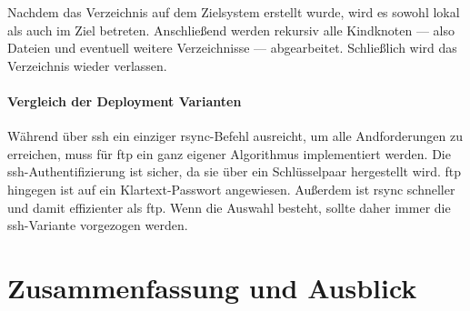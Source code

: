 Nachdem das Verzeichnis auf dem Zielsystem erstellt wurde, wird es sowohl lokal als auch im Ziel betreten. Anschließend werden rekursiv alle Kindknoten — also Dateien und eventuell weitere Verzeichnisse — abgearbeitet. Schließlich wird das Verzeichnis wieder verlassen.


\paragraph{Vergleich der Deployment Varianten} %
\label{ssub:vergleich_der_deployment_varianten}

Während über \gls{ssh} ein einziger rsync-Befehl ausreicht, um alle Andforderungen zu erreichen, muss für \gls{ftp} ein ganz eigener Algorithmus implementiert werden. Die \gls{ssh}-Authentifizierung ist sicher, da sie über ein Schlüsselpaar hergestellt wird. \gls{ftp} hingegen ist auf ein Klartext-Passwort angewiesen. Außerdem ist rsync schneller und damit effizienter als \gls{ftp}. Wenn die Auswahl besteht, sollte daher immer die \gls{ssh}-Variante vorgezogen werden.





\section{Zusammenfassung und Ausblick} %
\label{sec:zusammenfassung_und_ausblick}
